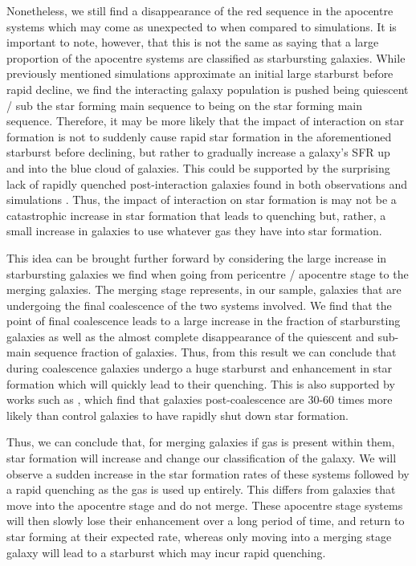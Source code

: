 Nonetheless, we still find a disappearance of the red sequence in the apocentre systems which may come as unexpected to when compared to simulations. It is important to note, however, that this is not the same as saying that a large proportion of the apocentre systems are classified as starbursting galaxies. While previously mentioned simulations approximate an initial large starburst before rapid decline, we find the interacting galaxy population is pushed being quiescent / sub the star forming main sequence to being on the star forming main sequence. Therefore, it may be more likely that the impact of interaction on star formation is not to suddenly cause rapid star formation in the aforementioned starburst before declining, but rather to gradually increase a galaxy's SFR up and into the blue cloud of galaxies. This could be supported by the surprising lack of rapidly quenched post-interaction galaxies found in both observations \citep{2017ApJ...845..145W} and simulations \citep{2020MNRAS.493.3716H, 2021MNRAS.504.1888Q}. Thus, the impact of interaction on star formation is may not be a catastrophic increase in star formation that leads to quenching but, rather, a small increase in galaxies to use whatever gas they have into star formation. %

This idea can be brought further forward by considering the large increase in starbursting galaxies we find when going from pericentre / apocentre stage to the merging galaxies. The merging stage represents, in our sample, galaxies that are undergoing the final coalescence of the two systems involved. We find that the point of final coalescence leads to a large increase in the fraction of starbursting galaxies as well as the almost complete disappearance of the quiescent and sub-main sequence fraction of galaxies. Thus, from this result we can conclude that during coalescence galaxies undergo a huge starburst and enhancement in star formation which will quickly lead to their quenching. This is also supported by works such as \citet{2022MNRAS.517L..92E}, which find that galaxies post-coalescence are 30-60 times more likely than control galaxies to have rapidly shut down star formation.

Thus, we can conclude that, for merging galaxies if gas is present within them, star formation will increase and change our classification of the galaxy. We will observe a sudden increase in the star formation rates of these systems followed by a rapid quenching as the gas is used up entirely. This differs from galaxies that move into the apocentre stage and do not merge. These apocentre stage systems will then slowly lose their enhancement over a long period of time, and return to star forming at their expected rate, whereas only moving into a merging stage galaxy will lead to a starburst which may incur rapid quenching.

